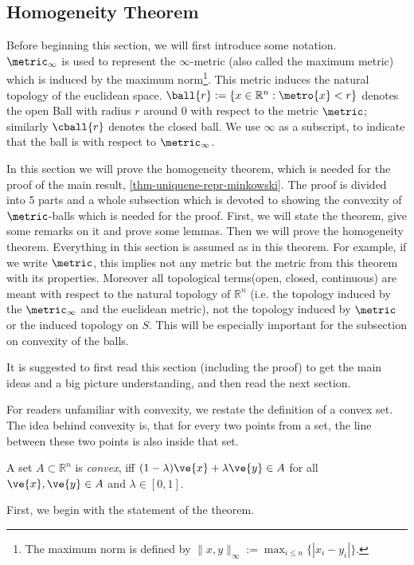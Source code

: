 \subsection{Homogeneity Theorem} \label{sect-homogeneity-theorem}
Before beginning this section, we will first introduce some notation.\\
$\metric_{\infty}$ is used to represent the $\infty$-metric (also called the maximum metric) which is induced by the maximum norm\footnote{The maximum norm is defined by $\|x,y\|_\infty := \max_{i \leq n} \{|x_i - y_i|\}.$}. This metric induces the natural topology of the euclidean space.
$\ball{r} := \{x \in \mathbb{R}^{n}: \metro{x} < r\} $ denotes the open Ball with radius $r$ around $0$ with respect to the metric $\metric$; similarly $\cball{r}$ denotes the closed ball. We use $\infty$ as a subscript, to indicate that the ball is with respect to $\metric_{\infty}$.

In this section we will prove the homogeneity theorem, which is needed for the proof of the main result, \cref{thm-uniquene-repr-minkowski}.
The proof is divided into 5 parts and a whole subsection which is devoted to showing the convexity of $\metric$-balls which is needed for the proof.
First, we will state the theorem, give some remarks on it and prove some lemmas. Then we will prove the homogeneity theorem.
Everything in this section is assumed as in this theorem. For example, if we write $\metric$, this implies not any metric but the metric from this theorem with its properties.
Moreover all topological terms(open, closed, continuous) are meant with respect to the natural topology of $\mathbb{R}^{n}$ (i.e. the topology induced by the $\metric_{\infty}$ and the euclidean metric), not the topology induced by $\metric$ or the induced topology on $S$. This will be especially important for the subsection on convexity of the balls.

It is suggested to first read this section (including the proof) to get the main ideas and a big picture understanding, and then read the next section.

For readers unfamiliar with convexity, we restate the definition of a convex set. The idea behind convexity is, that for every two points from a set, the line between these two points is also inside that set.

\begin{defi}[Convexity]
  A set $A \subset \mathbb{R}^{n}$ is \emph{convex}, iff $(1 - \lambda) \ve{x} + \lambda \ve{y} \in A$ for all $\ve{x}, \ve{y} \in A$ and $\lambda \in [0,1]$. 
\end{defi}
First, we begin with the statement of the theorem.

